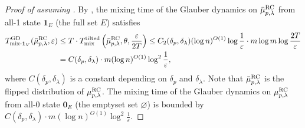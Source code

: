 \documentclass[11pt,a4paper]{article}
\renewcommand{\epsilon}{\varepsilon}
\newcommand{\mixtl}{T_{\textnormal{mix}}^{\textnormal{tilted}}}
\newcommand{\mixmax}{T_{\textnormal{mix-}\*1_V}^{\textnormal{GD}}}
\theoremstyle{definition}
\renewcommand{\emptyset}{\varnothing}
\def\*#1{\mathbf{#1}} %
\begin{document}
\begin{proof}[Proof of  assuming ]
    By , the mixing time of the Glauber dynamics on $\bar{\mu}_{p,\lambda}^{\textnormal{RC}}$ from all-1 state $\*1_E$ (the full set $E$) satisfies
    \begin{align*}
        \mixmax(\bar{\mu}_{p,\lambda}^{\textnormal{RC}},\epsilon)&\leq T \cdot \mixtl\left(\bar{\mu}_{p,\lambda}^{\textnormal{RC}},\theta,\frac{\epsilon}{2T}\right) \leq C_2(\delta_p,\delta_\lambda)(\log n)^{O(1)}\log\frac{1}{\epsilon} \cdot m \log m \log \frac{2T}{\epsilon}\\
        &= C(\delta_p,\delta_\lambda) \cdot m (\log n)^{O(1)} \log^2 \frac{1}{\epsilon}, 
    \end{align*}
    where $C(\delta_p,\delta_\lambda)$ is a constant depending on $\delta_p$ and $\delta_\lambda$.
    Note that $\bar{\mu}_{p,\lambda}^{\textnormal{RC}}$ is the flipped distribution of $\mu_{p,\lambda}^{\textnormal{RC}}$. The mixing time of the Glauber dynamics on $\mu_{p,\lambda}^{\textnormal{RC}}$ from all-0 state $\*0_E$ (the emptyset set $\emptyset$) is bounded by $ C(\delta_p,\delta_\lambda) \cdot m (\log n)^{O(1)} \log^2 \frac{1}{\epsilon}$.
    \end{proof}





\end{document}
